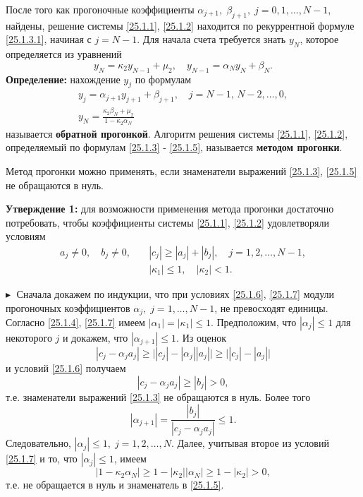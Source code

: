 После того как прогоночные коэффициенты $\alpha_{j+1}, \; \beta_{j+1}, \; j = 0, 1, \ldots, N-1$, найдены, решение системы \eqref{25.1.1}, \eqref{25.1.2} находится по рекуррентной формуле \eqref{25.1.3.1}, начиная с $j = N-1$. Для начала счета требуется знать $y_N$, которое определяется из уравнений 
$$
y_N = \kappa_2 y_{N-1} + \mu_2, \quad y_{N-1} = \alpha_N y_N + \beta_N.
$$ 
\textbf{Определение:\;} нахождение $y_j$ по формулам
\begin{equation}
    \label{25.1.5}
    \begin{gathered}
        y_j = \alpha_{j+1} y_{j+1} + \beta_{j+1}, \quad j = N-1, \, N-2, \ldots, 0,\\
        y_N = \frac{\kappa_2\beta_N + \mu_2}{1 - \kappa_2 \alpha_N}
    \end{gathered}
\end{equation}
называется \textbf{обратной прогонкой}. Алгоритм решения системы \eqref{25.1.1}, \eqref{25.1.2}, определяемый по формулам \eqref{25.1.3} - \eqref{25.1.5}, называется \textbf{методом прогонки}.

Метод прогонки можно применять, если знаменатели выражений \eqref{25.1.3}, \eqref{25.1.5} не обращаются в нуль. 

\textbf{Утверждение 1:\;} для возможности применения метода прогонки достаточно потребовать, чтобы коэффициенты системы \eqref{25.1.1}, \eqref{25.1.2} удовлетворяли условиям
\begin{align} 
\label{25.1.6}
    a_j \ne 0, \quad b_j \ne 0,\quad &|c_j|\geq|a_j| + |b_j|, \quad j = 1, 2, \ldots, N-1,\\
    \label{25.1.7}
    &|\kappa_1| \leq 1, \quad |\kappa_2| < 1.
\end{align}

$\blacktriangleright\;$ Сначала докажем по индукции, что при условиях \eqref{25.1.6}, \eqref{25.1.7} модули прогоночных коэффициентов $\alpha_j, \; j = 1, \ldots, N-1$, не превосходят единицы. Согласно \eqref{25.1.4}, \eqref{25.1.7} имеем $|\alpha_1| = |\kappa_1| \leq 1$. Предположим, что $|\alpha_j| \leq 1$ для некоторого $j$ и докажем, что $|\alpha_{j+1}| \leq 1$. Из оценок 
$$
|c_j - \alpha_j a_j| \geq \big| |c_j| - |\alpha_j| |a_j|\big| \geq \big||c_j| - |a_j|\big|
$$
и условий \eqref{25.1.6} получаем 
$$
|c_j - \alpha_j a_j| \geq |b_j| > 0,
$$
т.е. знаменатели выражений \eqref{25.1.3} не обращаются в нуль. Более того
$$
|\alpha_{j+1}| = \frac{|b_j|}{|c_j - \alpha_j a_j|} \leq 1.
$$
Следовательно, $|\alpha_j| \leq 1, \; j = 1, 2, \ldots, N$. Далее, учитывая второе из условий \eqref{25.1.7} и то, что $|\alpha_j| \leq 1$, имеем
$$
|1 - \kappa_2 \alpha_N| \geq 1 - |\kappa_2| |\alpha_N| \geq 1 - |\kappa_2| > 0,
$$
т.е. не обращается в нуль и знаменатель в \eqref{25.1.5}. 

